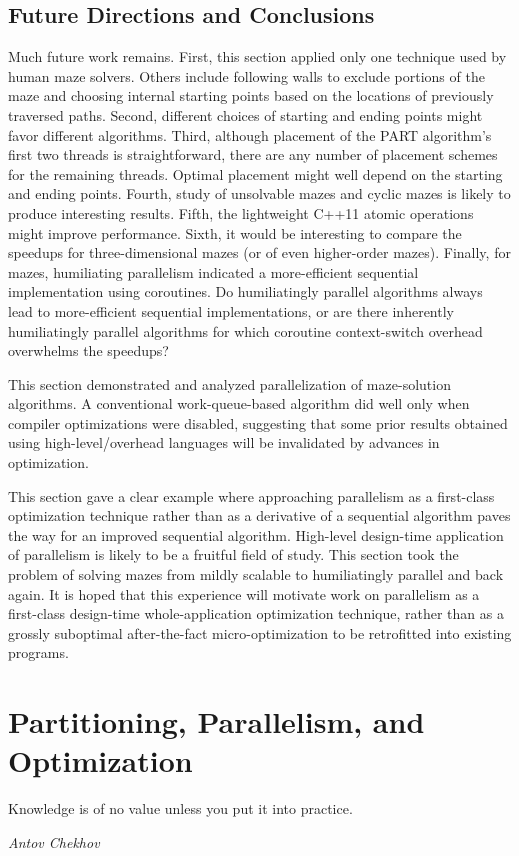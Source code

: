 \subsection{Future Directions and Conclusions}
\label{sec:SMPdesign:Future Directions and Conclusions}

Much future work remains.
First, this section applied only one technique used by human maze solvers.
Others include following walls to exclude portions of the maze
and choosing internal starting points based on the
locations of previously traversed paths.
Second, different choices of
starting and ending points might favor different algorithms.
Third, although placement of the PART algorithm's
first two threads is straightforward, there are any number of
placement schemes for the remaining threads.
Optimal placement might well depend on the starting and ending points.
Fourth, study of unsolvable mazes and cyclic mazes
is likely to produce interesting results.
Fifth, the lightweight C++11 atomic operations might improve performance.
Sixth, it would be interesting to compare the speedups for
three-dimensional mazes (or of even higher-order mazes).
Finally, for mazes, humiliating parallelism indicated a
more-efficient sequential implementation using coroutines.
Do humiliatingly parallel algorithms always lead to more-efficient
sequential implementations, or are there inherently humiliatingly parallel
algorithms for which coroutine context-switch overhead overwhelms the
speedups?

This section demonstrated and analyzed parallelization of maze-solution
algorithms.
A conventional work-queue-based algorithm did well only when compiler
optimizations were disabled, suggesting that some prior results obtained
using high-level/overhead languages will be invalidated
by advances in optimization.

This section gave a clear example where approaching parallelism
as a first-class optimization technique rather than as a derivative of a
sequential algorithm paves the way for an improved sequential algorithm.
High-level design-time application of parallelism is likely to be a
fruitful field of study.
This section took the problem of solving mazes from mildly scalable
to humiliatingly parallel and back again.
It is hoped that this experience will motivate work on parallelism
as a first-class design-time whole-application optimization technique,
rather than as a grossly suboptimal after-the-fact micro-optimization
to be retrofitted into existing programs.

\section{Partitioning, Parallelism, and Optimization}
\label{sec:SMPdesign:Partitioning, Parallelism, and Optimization}
%
\epigraph{Knowledge is of no value unless you put it into practice.}
	 {\emph{Antov Chekhov}}

